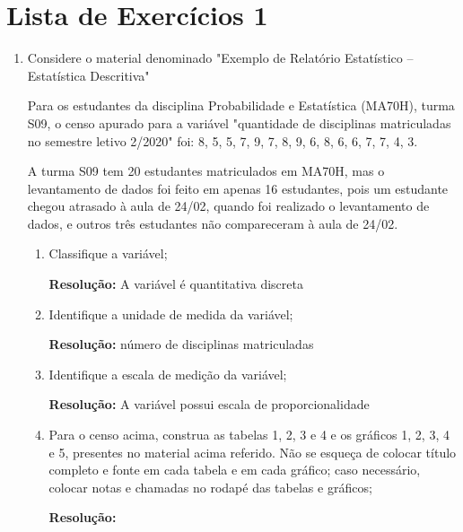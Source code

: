 \chapter{Lista de Exercícios 1}


\begin{enumerate}[label=\emph{\arabic*})]

	\item Considere o material denominado "Exemplo de Relatório Estatístico – Estatística Descritiva"

	      Para os estudantes da disciplina Probabilidade e Estatística (MA70H), turma S09, o censo apurado para a variável "quantidade de disciplinas matriculadas no semestre letivo 2/2020" foi: 8, 5, 5, 7, 9, 7, 8, 9, 6, 8, 6, 6, 7, 7, 4, 3.

	      A turma S09 tem 20 estudantes matriculados em MA70H, mas o levantamento de dados foi feito em apenas 16 estudantes, pois um estudante chegou atrasado à aula de 24/02, quando foi realizado o levantamento de dados, e outros três estudantes não compareceram à aula de 24/02.

	      \begin{enumerate}[label=\emph{\alph*})]

		      \item Classifique a variável;

		            \textbf{Resolução:}	A variável é quantitativa discreta

		      \item Identifique a unidade de medida da variável;

		            \textbf{Resolução:}	número de disciplinas matriculadas

		      \item Identifique a escala de medição da variável;

		            \textbf{Resolução:}	A variável possui escala de proporcionalidade

		      \item \label{item_graficos} Para o censo acima, construa as tabelas 1, 2, 3 e 4 e os gráficos 1, 2, 3, 4 e 5, presentes no material acima referido. Não se esqueça de colocar título completo e fonte em cada tabela e em cada gráfico; caso necessário, colocar notas e chamadas no rodapé das tabelas e gráficos;

		            \textbf{Resolução:}


\end{enumerate}
\end{enumerate}

